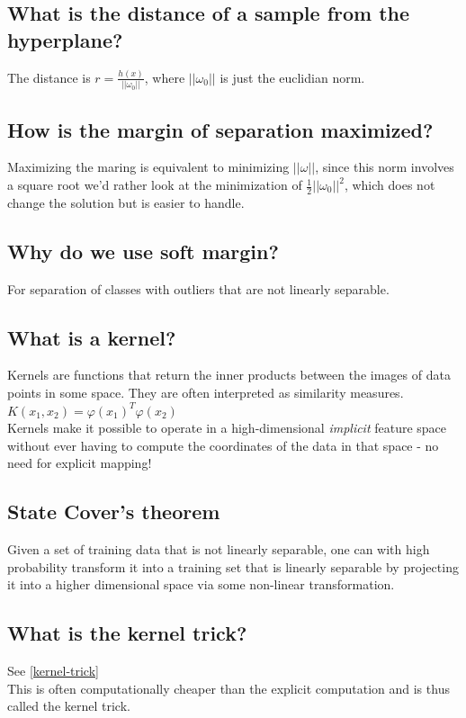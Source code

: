 \documentclass[12pt]{scrartcl}
\begin{document}
\subsection{What is the distance of a sample from the hyperplane?}
The distance is $r = \frac{h(x)}{||\omega_0||}$, where $||\omega_0||$ is just the euclidian norm.

\subsection{How is the margin of separation maximized?}
Maximizing the maring is equivalent to minimizing $||\omega||$, since this norm involves a square root we'd rather look at the minimization of $\frac{1}{2}||\omega_0||^2$, which does not change the solution but is easier to handle.

\subsection{Why do we use soft margin?}
For separation of classes with outliers that are not linearly separable.

\subsection{What is a kernel?}
Kernels are functions that return the inner products between the images of data points in some space. They are often interpreted as similarity measures. $K(x_1,x_2)=\varphi(x_1)^T \varphi(x_2)$ \\
\label{kernel-trick}Kernels make it possible to operate in a high-dimensional {\it implicit} feature space without ever having to compute the coordinates of the data in that space - no need for explicit mapping!

\subsection{State Cover's theorem}
Given a set of training data that is not linearly separable, one can with high probability transform it into a training set that is linearly separable by projecting it into a higher dimensional space via some non-linear transformation.

\subsection{What is the kernel trick?}
See \ref{kernel-trick} \\
This is often computationally cheaper than the explicit computation and is thus called the kernel trick.
\end{document}
